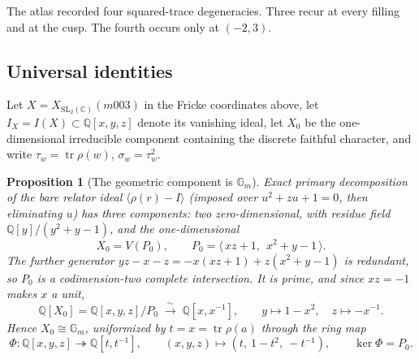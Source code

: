 \documentclass[11pt,a4paper]{article}
\newtheorem{proposition}[theorem]{Proposition}
\theoremstyle{definition}
\theoremstyle{remark}
\newcommand{\tr}{\operatorname{tr}}
\newcommand{\SLtwo}{\mathrm{SL}_2(\mathbb{C})}
\newcommand{\Q}{\mathbb{Q}}
\begin{document}
The atlas recorded four squared-trace degeneracies. Three recur at
every filling and at the cusp. The fourth occurs only at $(-2,3)$.

\subsection{Universal identities}

Let $X = X_{\SLtwo}(m003)$ in the Fricke coordinates above, let
$I_X = I(X) \subset \Q[x,y,z]$ denote its vanishing ideal, let $X_0$
be the one-dimensional irreducible component containing the discrete
faithful character, and write $\tau_w = \tr\rho(w)$,
$\sigma_w = \tau_w^2$.

\begin{proposition}[The geometric component is $\mathbb{G}_m$]
\label{prop:x0gm}
Exact primary decomposition of the bare relator ideal
$\langle \rho(r) - I\rangle$ (imposed over $u^2+zu+1=0$, then
eliminating $u$) has three components: two zero-dimensional, with
residue field $\Q[y]/(y^2+y-1)$, and the one-dimensional
\begin{equation}
X_0 = V(P_0), \qquad
P_0 = \langle\, xz + 1,\ \ x^2 + y - 1\,\rangle .
\end{equation}
The further generator $yz - x - z = -x(xz+1) + z(x^2+y-1)$ is
redundant, so $P_0$ is a codimension-two complete intersection. It is
prime, and since $xz = -1$ makes $x$ a unit,
\begin{equation}
\Q[X_0] = \Q[x,y,z]/P_0 \;\xrightarrow{\ \sim\ }\; \Q[x,x^{-1}],
\qquad y \longmapsto 1 - x^2, \quad z \longmapsto -x^{-1}.
\end{equation}
Hence $X_0 \cong \mathbb{G}_m$, uniformized by $t = x = \tr\rho(a)$
through the ring map
\begin{equation}
\Phi : \Q[x,y,z] \twoheadrightarrow \Q[t,t^{-1}], \qquad
(x,y,z) \longmapsto (t,\ 1-t^2,\ -t^{-1}), \qquad
\ker\Phi = P_0 .
\end{equation}
\end{proposition}
\end{document}

